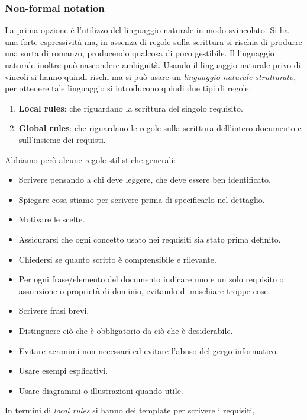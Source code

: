 \subsubsection{Non-formal notation}
La prima opzione è l'utilizzo del linguaggio naturale in modo svincolato. Si ha
una forte espressività ma, in assenza di regole sulla scrittura si rischia di
produrre una sorta di romanzo, producendo qualcosa di poco gestibile. Il linguaggio
naturale inoltre può nascondere ambiguità. Usando il linguaggio naturale privo
di vincoli si hanno quindi rischi ma si può usare un \textit{linguaggio naturale
      strutturato}, per ottenere tale linguaggio si introducono quindi due tipi
di regole:
\begin{enumerate}
      \item \textbf{Local rules}: che riguardano la scrittura del singolo requisito.
      \item \textbf{Global rules}: che riguardano le regole sulla scrittura
            dell'intero documento e sull'insieme dei requisti.
\end{enumerate}
Abbiamo però alcune regole stilistiche generali:
\begin{itemize}
      \item Scrivere pensando a chi deve leggere, che deve essere ben identificato.
      \item Spiegare cosa stiamo per scrivere prima di specificarlo nel dettaglio.
      \item Motivare le scelte.
      \item Assicurarsi che ogni concetto usato nei requisiti sia stato prima definito.
      \item Chiedersi se quanto scritto è comprensibile e rilevante.
      \item Per ogni frase/elemento del documento indicare uno e un solo requisito
            o assunzione o proprietà di dominio, evitando di mischiare troppe cose.
      \item Scrivere frasi brevi.
      \item Distinguere ciò che è obbligatorio da ciò che è desiderabile.
      \item Evitare acronimi non necessari ed evitare l'abuso del gergo informatico.
      \item Usare esempi esplicativi.
      \item Usare diagrammi o illustrazioni quando utile.
\end{itemize}
In termini di \textit{local rules} si hanno dei template per scrivere i requisiti,
